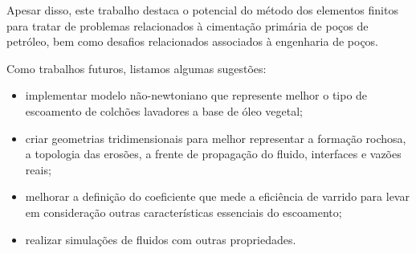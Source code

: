 Apesar disso, este trabalho destaca o potencial do método dos elementos finitos para tratar de problemas relacionados à cimentação primária de poços de petróleo, bem como desafios relacionados associados à engenharia de poços.

Como trabalhos futuros, listamos algumas sugestões:
\begin{itemize}
    \item implementar modelo não-newtoniano que represente melhor o tipo de escoamento de colchões lavadores a base de óleo vegetal;
    \item criar geometrias tridimensionais para melhor representar a formação rochosa, a topologia das erosões, a frente de propagação do fluido, interfaces e vazões reais; 
    \item melhorar a definição do coeficiente que mede a eficiência de varrido para levar em consideração outras características essenciais do escoamento; 
    \item realizar simulações de fluidos com outras propriedades.
\end{itemize}